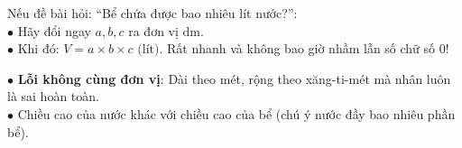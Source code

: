 \documentclass[14pt,a4paper,oneside]{extbook}
\begin{document}
\vspace{3mm}

\noindent
\begin{minipage}[t]{0.54\textwidth}
  \begin{tcolorbox}[
    enhanced,
    title={\footnotesize\bfseries\color{white}\faBolt\ Đổi kích thước ra đề-xi-mét để ra Lít},
    colback=green!3!white,
    colframe=green!60!black,
    arc=2.5mm, boxrule=0.8pt, top=1.8mm, bottom=1.8mm, left=2.2mm, right=2.2mm
  ]
    \footnotesize
    Nếu đề bài hỏi: ``Bể chứa được bao nhiêu lít nước?'':\\
    $\bullet$ Hãy đổi ngay $a, b, c$ ra đơn vị \textbf{$\text{dm}$}.\\
    $\bullet$ Khi đó: $V = a \times b \times c\text{ (lít)}$. Rất nhanh và không bao giờ nhầm lẫn số chữ số $0$!
  \end{tcolorbox}
\end{minipage}%
\hfill
\begin{minipage}[t]{0.44\textwidth}
  \begin{tcolorbox}[
    enhanced,
    title={\footnotesize\bfseries\color{white}\faExclamationTriangle\ Mẹo tránh bẫy trắc nghiệm},
    colback=red!2!white,
    colframe=red!70!black,
    arc=2.5mm, boxrule=0.8pt, top=1.8mm, bottom=1.8mm, left=2.2mm, right=2.2mm
  ]
    \footnotesize
    $\bullet$ \textbf{Lỗi không cùng đơn vị}: Dài theo mét, rộng theo xăng-ti-mét mà nhân luôn là sai hoàn toàn.\\
    $\bullet$ Chiều cao của nước khác với chiều cao của bể (chú ý nước đầy bao nhiêu phần bể).
  \end{tcolorbox}
\end{minipage}
\end{document}

